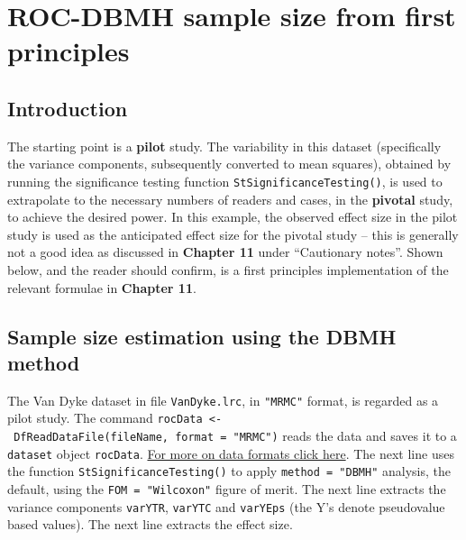 \documentclass[]{book}
\begin{document}
\hypertarget{SSRocFirstPrinciples}{%
\chapter{ROC-DBMH sample size from first principles}\label{SSRocFirstPrinciples}}

\hypertarget{introduction-7}{%
\section{Introduction}\label{introduction-7}}

The starting point is a \textbf{pilot} study. The variability in this dataset (specifically the variance components, subsequently converted to mean squares), obtained by running the significance testing function \texttt{StSignificanceTesting()}, is used to extrapolate to the necessary numbers of readers and cases, in the \textbf{pivotal} study, to achieve the desired power. In this example, the observed effect size in the pilot study is used as the anticipated effect size for the pivotal study -- this is generally not a good idea as discussed in \textbf{Chapter 11} under ``Cautionary notes''. Shown below, and the reader should confirm, is a first principles implementation of the relevant formulae in \textbf{Chapter 11}.

\hypertarget{sample-size-estimation-using-the-dbmh-method}{%
\section{Sample size estimation using the DBMH method}\label{sample-size-estimation-using-the-dbmh-method}}

The Van Dyke dataset in file \texttt{VanDyke.lrc}, in \texttt{"MRMC"} format, is regarded as a pilot study. The command \texttt{rocData\ \textless{}-\ DfReadDataFile(fileName,\ format\ =\ "MRMC")} reads the data and saves it to a \texttt{dataset} object \texttt{rocData}. \href{https://dpc10ster.github.io/RJafroc/reference/RJafroc-package.html}{For more on data formats click here}. The next line uses the function \texttt{StSignificanceTesting()} to apply \texttt{method\ =\ "DBMH"} analysis, the default, using the \texttt{FOM\ =\ "Wilcoxon"} figure of merit. The next line extracts the variance components \texttt{varYTR}, \texttt{varYTC} and \texttt{varYEps} (the Y's denote pseudovalue based values). The next line extracts the effect size.
\end{document}
